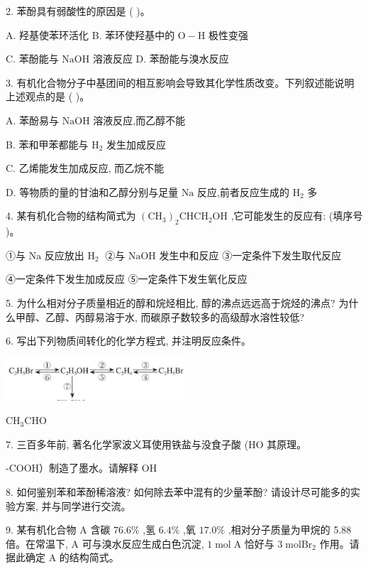 \documentclass[10pt]{article}
\begin{document}
2. 苯酚具有弱酸性的原因是 ( )。

A. 羟基使苯环活化 B. 苯环使羟基中的 \(\mathrm{O} - \mathrm{H}\) 极性变强

C. 苯酚能与 \(\mathrm{{NaOH}}\) 溶液反应 D. 苯酚能与溴水反应

3. 有机化合物分子中基团间的相互影响会导致其化学性质改变。下列叙述能说明上述观点的是 ( )。

A. 苯酚易与 \(\mathrm{{NaOH}}\) 溶液反应,而乙醇不能

B. 苯和甲苯都能与 \({\mathrm{H}}_{2}\) 发生加成反应

C. 乙烯能发生加成反应, 而乙烷不能

D. 等物质的量的甘油和乙醇分别与足量 \(\mathrm{{Na}}\) 反应,前者反应生成的 \({\mathrm{H}}_{2}\) 多

4. 某有机化合物的结构简式为 \({\left( {\mathrm{{CH}}}_{3}\right) }_{2}{\mathrm{{CHCH}}}_{2}\mathrm{{OH}}\) ,它可能发生的反应有: (填序号 )。

①与 \(\mathrm{{Na}}\) 反应放出 \({\mathrm{H}}_{2}\;\) ②与 \(\mathrm{{NaOH}}\) 发生中和反应 ③一定条件下发生取代反应

④一定条件下发生加成反应 ⑤一定条件下发生氧化反应

5. 为什么相对分子质量相近的醇和烷烃相比, 醇的沸点远远高于烷烃的沸点? 为什么甲醇、乙醇、丙醇易溶于水, 而碳原子数较多的高级醇水溶性较低?

6. 写出下列物质间转化的化学方程式, 并注明反应条件。

\begin{center}
\includegraphics[max width=0.5\textwidth]{images/0190efc5-b58a-7c43-bfb0-e0a030df9cfd_72_635505.jpg}
\end{center}

\({\mathrm{{CH}}}_{3}\mathrm{{CHO}}\)

7. 三百多年前, 著名化学家波义耳使用铁盐与没食子酸 (HO 其原理。

-COOH）制造了墨水。请解释 \(\mathrm{{OH}}\)

8. 如何鉴别苯和苯酚稀溶液? 如何除去苯中混有的少量苯酚? 请设计尽可能多的实验方案, 并与同学进行交流。

9. 某有机化合物 A 含碳 \({76.6}\%\) ,氢 \({6.4}\%\) ,氧 \({17.0}\%\) ,相对分子质量为甲烷的 5.88 倍。在常温下, A 可与溴水反应生成白色沉淀, \(1\mathrm{\;{mol}}\mathrm{\;A}\) 恰好与 \(3\mathrm{\;{mol}}{\mathrm{{Br}}}_{2}\) 作用。请据此确定 \(\mathrm{A}\) 的结构简式。
\end{document}
